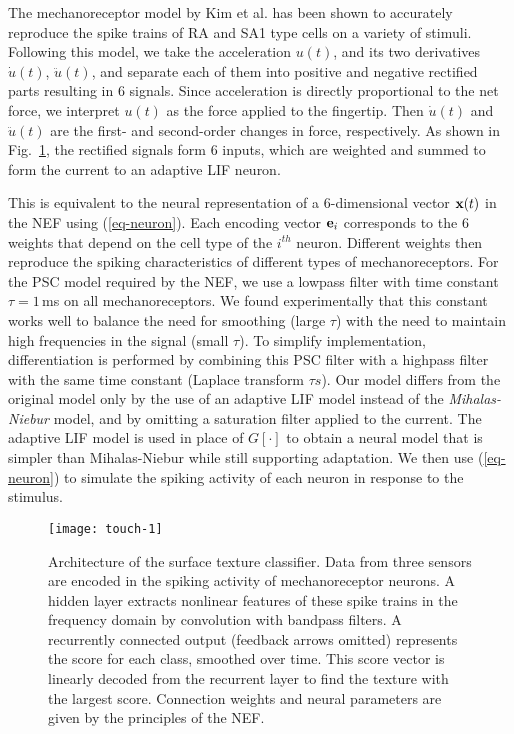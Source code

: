 
The mechanoreceptor model by Kim et al. \cite{kim2011does} has been shown to accurately reproduce the spike trains of RA and SA1 type cells on a variety of stimuli.  Following this model, we take the acceleration $u(t)$, and its two derivatives $\dot{u}(t)$, $\ddot{u}(t)$, and separate each of them into positive and negative rectified parts resulting in $6$ signals. %
Since acceleration is directly proportional to the net force, we interpret $u(t)$ as the force applied to the fingertip.
Then $\dot{u}(t)$ and $\ddot{u}(t)$ are the first- and second-order changes in force, respectively.  As shown in \mbox{Fig. \ref{fig:touch-network}}, the rectified signals form 6 inputs, which are weighted and summed to form the current to an adaptive LIF neuron.

This is equivalent to the neural representation of a $6$-dimensional vector $\mathbf{x}(t)$ in the NEF using (\ref{eq-neuron}). Each encoding vector $\mathbf{e}_i$ corresponds to the $6$ weights that depend on the cell type of the $i^{th}$ neuron. Different weights then reproduce the spiking characteristics of different types of mechanoreceptors.  For the PSC model required by the NEF, we use a lowpass filter with time constant $\tau = 1$\,ms on all mechanoreceptors. We found experimentally that this constant works well to balance the need for smoothing (large $\tau$) with the need to maintain high frequencies in the signal (small $\tau$).  To simplify implementation, differentiation is performed by combining this PSC filter with a highpass filter with the same time constant (Laplace transform $\tau s$). Our model differs from the original model only by  the use of an adaptive LIF model instead of the {\it Mihalas-Niebur} model, and by omitting a saturation filter applied to the current. The adaptive LIF model is used in place of $G[\cdot]$ to obtain a neural model that is simpler than Mihalas-Niebur while still supporting adaptation. We then use (\ref{eq-neuron}) to simulate the spiking activity of each neuron in response to the stimulus.

\begin{figure}[!tbp]
    \centering
    \vspace{-2pt}
    \texttt{[image: touch-1]}
     
    \caption{\label{fig:touch-network} Architecture of the surface texture classifier. Data from three sensors are encoded in the spiking activity of mechanoreceptor neurons. A hidden layer extracts nonlinear features of these spike trains in the frequency domain by convolution with bandpass filters. A recurrently connected output (feedback arrows omitted) represents the score for each class, smoothed over time. This score vector is linearly decoded from the recurrent layer to find the texture with the largest score. Connection weights and neural parameters  are given by the principles of the NEF.}
\end{figure}

